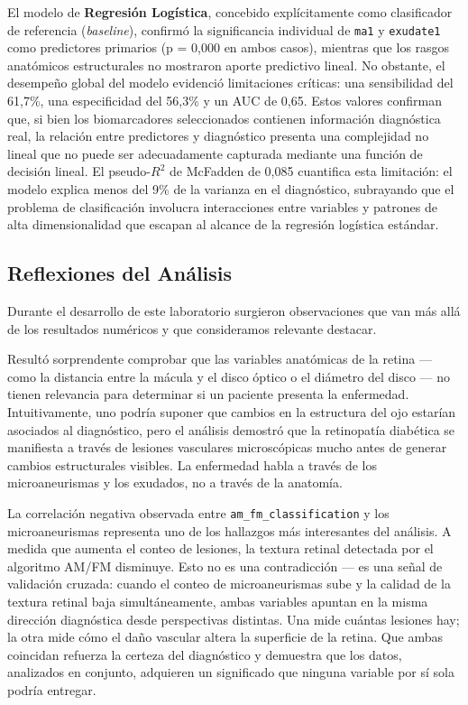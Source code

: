El modelo de \textbf{Regresión Logística}, concebido explícitamente como clasificador
de referencia (\textit{baseline}), confirmó la significancia individual de \texttt{ma1}
y \texttt{exudate1} como predictores primarios (p = 0,000 en ambos casos), mientras que
los rasgos anatómicos estructurales no mostraron aporte predictivo lineal. No obstante,
el desempeño global del modelo evidenció limitaciones críticas: una sensibilidad del
61,7\%, una especificidad del 56,3\% y un AUC de 0,65. Estos valores confirman que,
si bien los biomarcadores seleccionados contienen información diagnóstica real, la
relación entre predictores y diagnóstico presenta una complejidad no lineal que no puede
ser adecuadamente capturada mediante una función de decisión lineal. El pseudo-$R^{2}$
de McFadden de 0,085 cuantifica esta limitación: el modelo explica menos del 9\% de la
varianza en el diagnóstico, subrayando que el problema de clasificación involucra
interacciones entre variables y patrones de alta dimensionalidad que escapan al alcance
de la regresión logística estándar.

\subsection{Reflexiones del Análisis}

Durante el desarrollo de este laboratorio surgieron observaciones que van más allá de los resultados numéricos y que consideramos relevante destacar.

Resultó sorprendente comprobar que las variables anatómicas de la retina — como la distancia entre la mácula y el disco óptico o el diámetro del disco — no tienen relevancia para determinar si un paciente presenta la enfermedad. Intuitivamente, uno podría suponer que cambios en la estructura del ojo estarían asociados al diagnóstico, pero el análisis demostró que la retinopatía diabética se manifiesta a través de lesiones vasculares microscópicas mucho antes de generar cambios estructurales visibles. La enfermedad habla a través de los microaneurismas y los exudados, no a través de la anatomía.

La correlación negativa observada entre \texttt{am\_fm\_classification} y los microaneurismas representa uno de los hallazgos más interesantes del análisis. A medida que aumenta el conteo de lesiones, la textura retinal detectada por el algoritmo AM/FM disminuye. Esto no es una contradicción — es una señal de validación cruzada: cuando el conteo de microaneurismas sube y la calidad de la textura retinal baja simultáneamente, ambas variables apuntan en la misma dirección diagnóstica desde perspectivas distintas. Una mide cuántas lesiones hay; la otra mide cómo el daño vascular altera la superficie de la retina. Que ambas coincidan refuerza la certeza del diagnóstico y demuestra que los datos, analizados en conjunto, adquieren un significado que ninguna variable por sí sola podría entregar.

